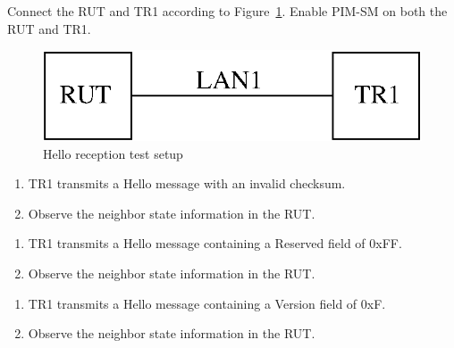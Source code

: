 \documentclass[11pt]{report}
\begin{document}
Connect the RUT and TR1 according to Figure~\ref{fig:pim_test_2_3_hello_reception}.
Enable PIM-SM on both the RUT and TR1.

\begin{figure}[htbp]
  \begin{center}
    \includegraphics[scale=0.8]{figs/pim_test_2_3_hello_reception}
    \caption{Hello reception test setup}
    \label{fig:pim_test_2_3_hello_reception}
  \end{center}
\end{figure}



\begin{enumerate}

  \item TR1 transmits a Hello message with an invalid checksum.

  \item Observe the neighbor state information in the RUT.

\end{enumerate}


\begin{enumerate}

  \item TR1 transmits a Hello message containing a Reserved field of 0xFF.

  \item Observe the neighbor state information in the RUT.

\end{enumerate}


\begin{enumerate}

  \item TR1 transmits a Hello message containing a Version field of 0xF.

  \item Observe the neighbor state information in the RUT.

\end{enumerate}
\end{document}
